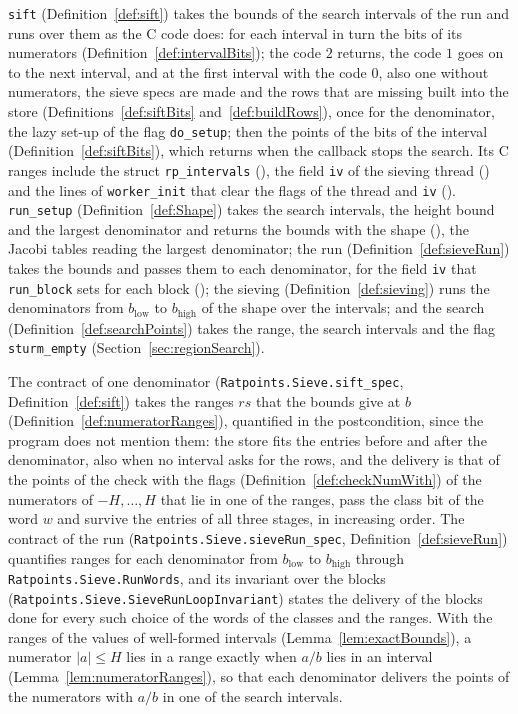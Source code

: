 \verb|sift| (Definition~\ref{def:sift}) takes the bounds of the search intervals of the run and runs
over them as the C code does: for each interval in turn the bits of its numerators
(Definition~\ref{def:intervalBits}); the code $2$ returns, the code $1$ goes on to the next
interval, and at the first interval with the code $0$, also one without numerators, the sieve specs
are made and the rows that are missing built into the store (Definitions~\ref{def:siftBits}
and~\ref{def:buildRows}), once for the denominator, the lazy set-up of the flag \verb|do_setup|;
then the points of the bits of the interval (Definition~\ref{def:siftBits}), which returns when the
callback stops the search. Its C ranges include the struct \verb|rp_intervals|
(), the field \verb|iv| of the sieving thread
() and the lines of \verb|worker_init| that clear the flags of the
thread and \verb|iv| (). \verb|run_setup|
(Definition~\ref{def:Shape}) takes the search intervals, the height bound and the largest
denominator and returns the bounds with the shape (), the Jacobi
tables reading the largest denominator; the run (Definition~\ref{def:sieveRun}) takes the bounds and
passes them to each denominator, for the field \verb|iv| that \verb|run_block| sets for each block
(); the sieving (Definition~\ref{def:sieving}) runs the
denominators from $b_{\mathrm{low}}$ to $b_{\mathrm{high}}$ of the shape over the intervals; and the
search (Definition~\ref{def:searchPoints}) takes the range, the search intervals and the flag
\verb|sturm_empty| (Section~\ref{sec:regionSearch}).

The contract of one denominator (\verb|Ratpoints.Sieve.sift_spec|, Definition~\ref{def:sift}) takes
the ranges $\mathit{rs}$ that the bounds give at $b$ (Definition~\ref{def:numeratorRanges}),
quantified in the postcondition, since the program does not mention them: the store fits the entries
before and after the denominator, also when no interval asks for the rows, and the delivery is that
of the points of the check with the flags (Definition~\ref{def:checkNumWith}) of the numerators of
$-H, \dots, H$ that lie in one of the ranges, pass the class bit of the word $w$ and survive the
entries of all three stages, in increasing order. The contract of the run
(\verb|Ratpoints.Sieve.sieveRun_spec|, Definition~\ref{def:sieveRun}) quantifies ranges for each
denominator from $b_{\mathrm{low}}$ to $b_{\mathrm{high}}$ through \verb|Ratpoints.Sieve.RunWords|,
and its invariant over the blocks (\verb|Ratpoints.Sieve.SieveRunLoopInvariant|) states the delivery
of the blocks done for every such choice of the words of the classes and the ranges. With the ranges
of the values of well-formed intervals (Lemma~\ref{lem:exactBounds}), a numerator $|a| \le H$ lies
in a range exactly when $a/b$ lies in an interval (Lemma~\ref{lem:numeratorRanges}), so that each
denominator delivers the points of the numerators with $a/b$ in one of the search intervals.

